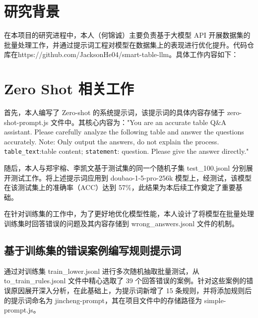 \documentclass[10.5pt,compsoc]{CjC}
\theoremstyle{mystyle}
\begin{document}
    \begin{CJK*}{UTF8}{zhhei}
\vskip 1mm
\section{研究背景}
在本项目的研究进程中，本人（何锦诚）主要负责基于大模型 API 开展数据集的批量处理工作，并通过提示词工程对模型在数据集上的表现进行优化提升。代码仓库在https://github.com/JacksonHe04/smart-table-llm。具体工作内容如下：

\section{Zero Shot 相关工作}
首先，本人编写了 Zero-shot 的系统提示词，该提示词的具体内容存储于 zero-shot-prompt.js 文件中。其核心内容为："You are an accurate table Q\&A assistant. Please carefully analyze the following table and answer the questions accurately. Note: Only output the answers, do not explain the process. \texttt{table\_text}:table content; \texttt{statement}: question. Please give the answer directly." 



随后，本人与郑宇榕、李凯文基于测试集的同一个随机子集 test\_100.jsonl 分别展开测试工作。将上述提示词应用到 doubao-1-5-pro-256k 模型上，经测试，该模型在该测试集上的准确率（ACC）达到 57\%，此结果为本后续工作奠定了重要基础。

在针对训练集的工作中，为了更好地优化模型性能，本人设计了将模型在批量处理训练集时回答错误的问题及其内容存储到 wrong\_answers.jsonl 文件的机制。

\subsection{基于训练集的错误案例编写规则提示词}
通过对训练集 train\_lower.jsonl 进行多次随机抽取批量测试，从 to\_train\_rules.jsonl 文件中精心选取了 39 个回答错误的案例。针对这些案例的错误原因展开深入分析，在此基础上，为提示词新增了 15 条规则，并将添加规则后的提示词命名为 jincheng-prompt，其在项目文件中的存储路径为 simple-prompt.js。


\end{CJK*}
\end{document}
